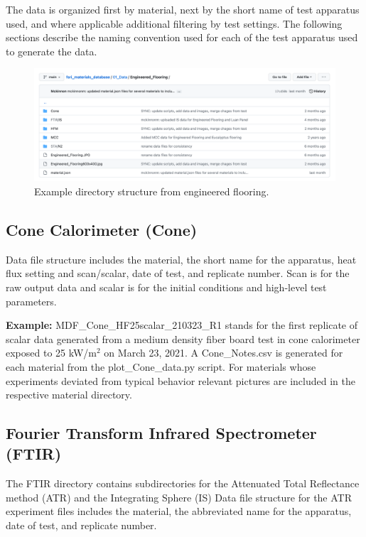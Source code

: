 \documentclass[12pt,oneside]{book}
\begin{document}
The data is organized first by material, next by the short name of test apparatus used, and where applicable additional filtering by test settings. The following sections describe the naming convention used for each of the test apparatus used to generate the data.

\begin{figure}[!ht]
\centering
\includegraphics[width=.95\columnwidth]{Figures/engineered_flooring_example}
\caption[Engineered Flooring Material Directory Example]{Example directory structure from engineered flooring.}
\label{fig:mat_list}
\end{figure}

\subsection{Cone Calorimeter (Cone)}
Data file structure includes the material, the short name for the apparatus, heat flux setting and scan/scalar, date of test, and replicate number. Scan is for the raw output data and scalar is for the initial conditions and high-level test parameters.

{\bf Example:} MDF\_Cone\_HF25scalar\_210323\_R1 stands for the first replicate of scalar data generated from a medium density fiber board test in cone calorimeter exposed to 25 kW/m$^2$ on March 23, 2021.
A Cone\_Notes.csv is generated for each material from the plot\_Cone\_data.py script. For materials whose experiments deviated from typical behavior relevant pictures are included in the respective material directory.

\subsection{Fourier Transform Infrared Spectrometer (FTIR)}
The FTIR directory contains subdirectories for the Attenuated Total Reflectance method (ATR) and the Integrating Sphere (IS)
Data file structure for the ATR experiment files includes the material, the abbreviated name for the apparatus, date of test, and replicate number.
\end{document}
